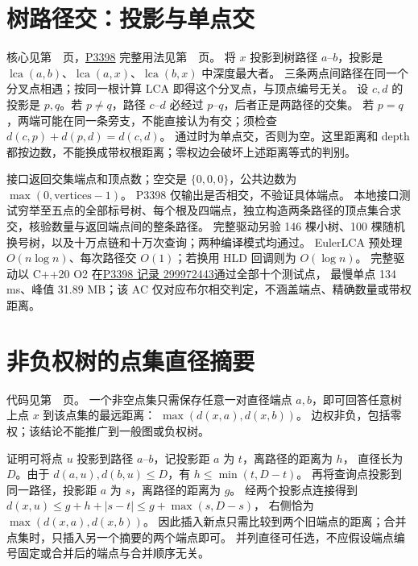\section{树路径交：投影与单点交}\label{knowledge-path-intersection}
核心见第~\pageref{compact-path_intersection}~页，\href{https://www.luogu.com.cn/problem/P3398}{P3398} 完整用法见第~\pageref{usage-example-169}~页。
将 $x$ 投影到树路径 $a$--$b$，投影是 $\operatorname{lca}(a,b)$、$\operatorname{lca}(a,x)$、$\operatorname{lca}(b,x)$ 中深度最大者。
三条两点间路径在同一个分叉点相遇；按同一根计算 LCA 即得这个分叉点，与顶点编号无关。
设 $c,d$ 的投影是 $p,q$。若 $p\ne q$，路径 $c$--$d$ 必经过 $p$--$q$，后者正是两路径的交集。
若 $p=q$，两端可能在同一条旁支，不能直接认为有交；须检查 $d(c,p)+d(p,d)=d(c,d)$。
通过时为单点交，否则为空。这里距离和 depth 都按边数，不能换成带权根距离；零权边会破坏上述距离等式的判别。

接口返回交集端点和顶点数；空交是 $\{0,0,0\}$，公共边数为 $\max(0,\mathrm{vertices}-1)$。
P3398 仅输出是否相交，不验证具体端点。
本地接口测试穷举至五点的全部标号树、每个根及四端点，独立构造两条路径的顶点集合求交，核验数量与返回端点间的整条路径。
完整驱动另验 146 棵小树、100 棵随机换号树，以及十万点链和十万次查询；两种编译模式均通过。
EulerLCA 预处理 $O(n\log n)$、每次路径交 $O(1)$；若换用 HLD 回调则为 $O(\log n)$。
完整驱动以 C++20 O2 在\href{https://www.luogu.com.cn/record/299972443}{P3398 记录 299972443}通过全部十个测试点，
最慢单点 134 ms、峰值 31.89 MB；该 AC 仅对应布尔相交判定，不涵盖端点、精确数量或带权距离。

\clearpage
\section{非负权树的点集直径摘要}\label{knowledge-set-diameter}
代码见第~\pageref{compact-TreeDiameter}~页。
一个非空点集只需保存任意一对直径端点 $a,b$，即可回答任意树上点 $x$ 到该点集的最远距离：
$\max(d(x,a),d(x,b))$。
边权非负，包括零权；该结论不能推广到一般图或负权树。

证明可将点 $u$ 投影到路径 $a$--$b$，记投影距 $a$ 为 $t$，离路径的距离为 $h$，
直径长为 $D$。由于 $d(a,u),d(b,u)\le D$，有 $h\le\min(t,D-t)$。
再将查询点投影到同一路径，投影距 $a$ 为 $s$，离路径的距离为 $g$。
经两个投影点连接得到
$d(x,u)\le g+h+|s-t|\le g+\max(s,D-s)$，
右侧恰为 $\max(d(x,a),d(x,b))$。
因此插入新点只需比较到两个旧端点的距离；合并点集时，只插入另一个摘要的两个端点即可。
并列直径可任选，不应假设端点编号固定或合并后的端点与合并顺序无关。


